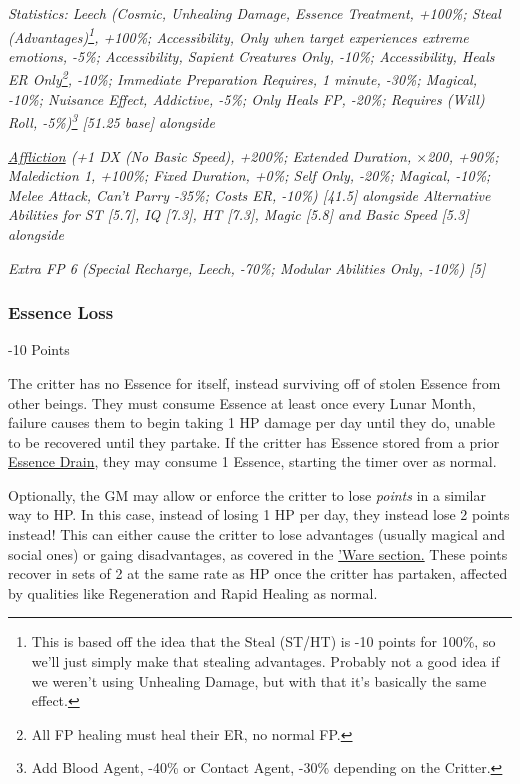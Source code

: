 \begin{multicols*}{3}
	\textcolor{OliveGreen}{\textit{Statistics: Leech (Cosmic, Unhealing Damage, Essence Treatment, +100\%; Steal (Advantages)\footnote{This is based off the idea that the Steal (ST/HT) is -10 points for 100\%, so we'll just simply make that stealing advantages. Probably not a good idea if we weren't using Unhealing Damage, but with that it's basically the same effect.}, +100\%; Accessibility, Only when target experiences extreme emotions, -5\%; Accessibility, Sapient Creatures Only, -10\%; Accessibility, Heals ER Only\footnote{All FP healing must heal their ER, no normal FP.}, -10\%; Immediate Preparation Requires, 1 minute, -30\%; Magical, -10\%; Nuisance Effect, Addictive, -5\%; Only Heals FP, -20\%; Requires (Will) Roll, -5\%)\footnote{Add Blood Agent, -40\% or Contact Agent, -30\% depending on the Critter.} [51.25 base] alongside}}
			
	 \textcolor{OliveGreen}{\textit{\textcolor{Blue}{\href{http://forums.sjgames.com/showthread.php?t=152300}{Affliction}} (+1 DX (No Basic Speed), +200\%; Extended Duration, $\times$200, +90\%; Malediction 1, +100\%; Fixed Duration, +0\%; Self Only, -20\%; Magical, -10\%; Melee Attack, Can't Parry -35\%; Costs ER, -10\%) [41.5] alongside Alternative Abilities for ST [5.7], IQ [7.3], HT [7.3], Magic [5.8] and Basic Speed [5.3] alongside}}
	 
	 \textcolor{OliveGreen}{\textit{ Extra FP 6 (Special Recharge, Leech, -70\%; Modular Abilities Only, -10\%) [5] }}
	 
	 
	 \subsubsection{Essence Loss}\label{essence_loss}
	 \begin{flushright}
	 	-10 Points
	 \end{flushright}
 
 	The critter has no Essence for itself, instead surviving off of stolen Essence from other beings. They must consume Essence at least once every Lunar Month, failure causes them to begin taking 1 HP damage per day until they do, unable to be recovered until they partake. If the critter has Essence stored from a prior \hyperref[essence_drain]{Essence Drain}, they may consume 1 Essence, starting the timer over as normal.
 	
 	Optionally, the GM may allow or enforce the critter to lose \textit{points} in a similar way to HP. In this case, instead of losing 1 HP per day, they instead lose 2 points instead! This can either cause the critter to lose advantages (usually magical and social ones) or gaing disadvantages, as covered in the \hyperref[ware]{'Ware section.} These points recover in sets of 2 at the same rate as HP once the critter has partaken, affected by qualities like Regeneration and Rapid Healing as normal.
 

\end{multicols*}
